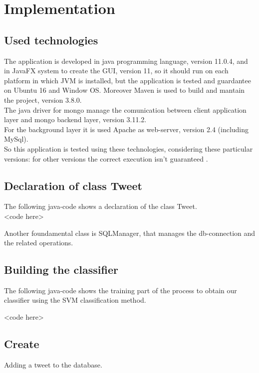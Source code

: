 \documentclass[a4paper, oneside]{article}
\begin{document}
\clearpage
\section{Implementation}
\subsection{Used technologies}
The application is developed in java programming language, version 11.0.4, and in JavaFX system to create the GUI, version 11, so it should run on each platform in which JVM is installed, but the application is tested and guardantee on Ubuntu 16 and Window OS. Moreover Maven is used  to build and mantain the project, version 3.8.0. \\
The java driver for mongo manage the comunication between client application layer and mongo backend layer, version 3.11.2.\\ 
For the background layer it is used Apache as web-server, version 2.4 (including MySql).\\
So this application is tested using these technologies, considering these particular versions: for other versions the correct execution isn't guaranteed .\\

\subsection{Declaration of class Tweet}
The following java-code shows a declaration of the class Tweet.
\vspace{2mm}
\\ <code here>
\vspace{5mm}

\noindent Another foundamental class is SQLManager, that manages the db-connection and the related operations.

\subsection{Building the classifier}
The following java-code shows the training part of the process to obtain our classifier using the SVM classification method.

<code here>


\subsection{Create}
Adding a tweet to the database.
\vspace{2mm}
 \\<Code here>
\vspace{5mm}
\end{document}
